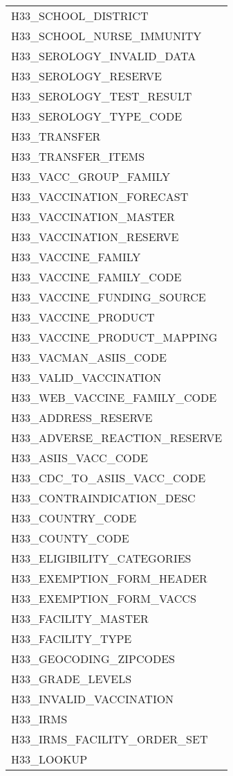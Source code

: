 \documentclass[
  letterpaper,
  DIV=11,
  numbers=noendperiod]{scrreprt}
\begin{document}
\begin{longtable}{l}
H33\_SCHOOL\_DISTRICT \\ 
H33\_SCHOOL\_NURSE\_IMMUNITY \\ 
H33\_SEROLOGY\_INVALID\_DATA \\ 
H33\_SEROLOGY\_RESERVE \\ 
H33\_SEROLOGY\_TEST\_RESULT \\ 
H33\_SEROLOGY\_TYPE\_CODE \\ 
H33\_TRANSFER \\ 
H33\_TRANSFER\_ITEMS \\ 
H33\_VACC\_GROUP\_FAMILY \\ 
H33\_VACCINATION\_FORECAST \\ 
H33\_VACCINATION\_MASTER \\ 
H33\_VACCINATION\_RESERVE \\ 
H33\_VACCINE\_FAMILY \\ 
H33\_VACCINE\_FAMILY\_CODE \\ 
H33\_VACCINE\_FUNDING\_SOURCE \\ 
H33\_VACCINE\_PRODUCT \\ 
H33\_VACCINE\_PRODUCT\_MAPPING \\ 
H33\_VACMAN\_ASIIS\_CODE \\ 
H33\_VALID\_VACCINATION \\ 
H33\_WEB\_VACCINE\_FAMILY\_CODE \\ 
H33\_ADDRESS\_RESERVE \\ 
H33\_ADVERSE\_REACTION\_RESERVE \\ 
H33\_ASIIS\_VACC\_CODE \\ 
H33\_CDC\_TO\_ASIIS\_VACC\_CODE \\ 
H33\_CONTRAINDICATION\_DESC \\ 
H33\_COUNTRY\_CODE \\ 
H33\_COUNTY\_CODE \\ 
H33\_ELIGIBILITY\_CATEGORIES \\ 
H33\_EXEMPTION\_FORM\_HEADER \\ 
H33\_EXEMPTION\_FORM\_VACCS \\ 
H33\_FACILITY\_MASTER \\ 
H33\_FACILITY\_TYPE \\ 
H33\_GEOCODING\_ZIPCODES \\ 
H33\_GRADE\_LEVELS \\ 
H33\_INVALID\_VACCINATION \\ 
H33\_IRMS \\ 
H33\_IRMS\_FACILITY\_ORDER\_SET \\ 
H33\_LOOKUP \\ 

\end{longtable}
\end{document}
